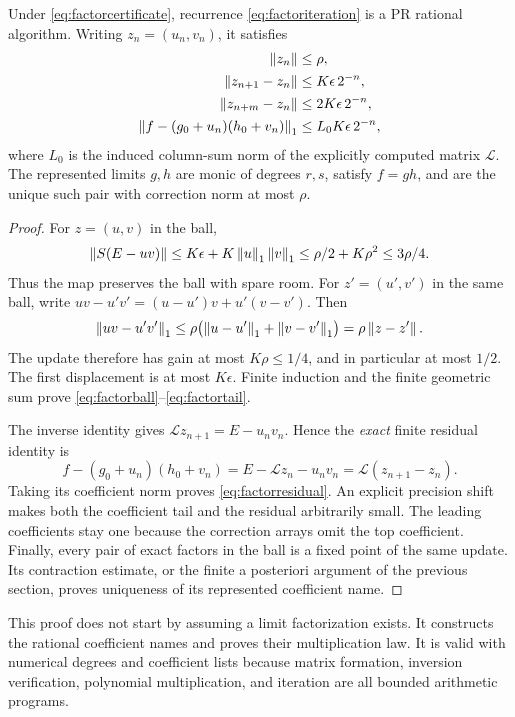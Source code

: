 \begin{theorem}\label{thm:factortransport}
Under \eqref{eq:factorcertificate}, recurrence \eqref{eq:factoriteration} is a PR rational algorithm. Writing \(z_n=(u_n,v_n)\), it satisfies
\begin{align}
 \left\lVert z_n\right\rVert&\le\rho,\label{eq:factorball}\\
 \left\lVert z_{n+1}-z_n\right\rVert&\le K\epsilon\,2^{-n},\label{eq:factorstep}\\
 \left\lVert z_{n+m}-z_n\right\rVert&\le2K\epsilon\,2^{-n},\label{eq:factortail}\\
 \left\lVert f-(g_0+u_n)(h_0+v_n)\right\rVert_1
 &\le L_0K\epsilon\,2^{-n},\label{eq:factorresidual}
\end{align}
where \(L_0\) is the induced column-sum norm of the explicitly computed matrix \(\mathcal L\). The represented limits \(g,h\) are monic of degrees \(r,s\), satisfy \(f=gh\), and are the unique such pair with correction norm at most \(\rho\).
\end{theorem}
\begin{proof}
For \(z=(u,v)\) in the ball,
\[
 \left\lVert S(E-uv)\right\rVert\le K\epsilon+K\left\lVert u\right\rVert_1\left\lVert v\right\rVert_1
 \le\rho/2+K\rho^2\le3\rho/4.
\]
Thus the map preserves the ball with spare room. For \(z'=(u',v')\) in the same ball, write
\(uv-u'v'=(u-u')v+u'(v-v')\). Then
\[
 \left\lVert uv-u'v'\right\rVert_1
 \le\rho\bigl(\left\lVert u-u'\right\rVert_1+\left\lVert v-v'\right\rVert_1\bigr)
 =\rho\left\lVert z-z'\right\rVert.
\]
The update therefore has gain at most \(K\rho\le1/4\), and in particular at most \(1/2\). The first displacement is at most \(K\epsilon\). Finite induction and the finite geometric sum prove \eqref{eq:factorball}--\eqref{eq:factortail}.

The inverse identity gives
\(\mathcal Lz_{n+1}=E-u_nv_n\). Hence the \emph{exact} finite residual identity is
\[
 f-(g_0+u_n)(h_0+v_n)
 =E-\mathcal Lz_n-u_nv_n
 =\mathcal L(z_{n+1}-z_n).
\]
Taking its coefficient norm proves \eqref{eq:factorresidual}. An explicit precision shift makes both the coefficient tail and the residual arbitrarily small. The leading coefficients stay one because the correction arrays omit the top coefficient. Finally, every pair of exact factors in the ball is a fixed point of the same update. Its contraction estimate, or the finite a posteriori argument of the previous section, proves uniqueness of its represented coefficient name.
\end{proof}

This proof does not start by assuming a limit factorization exists. It constructs the rational coefficient names and proves their multiplication law. It is valid with numerical degrees and coefficient lists because matrix formation, inversion verification, polynomial multiplication, and iteration are all bounded arithmetic programs.

